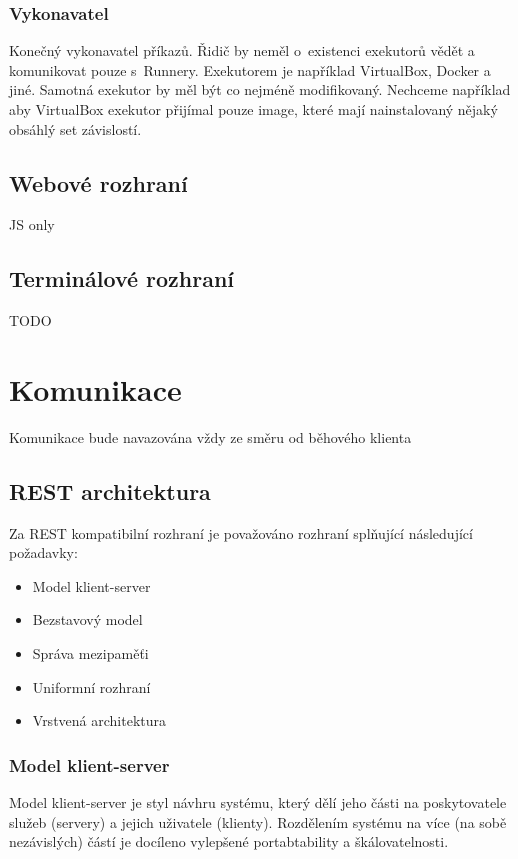 \subsubsection{Vykonavatel}

Konečný vykonavatel příkazů. Řidič by neměl o~existenci exekutorů vědět a komunikovat pouze s~Runnery.
Exekutorem je například VirtualBox, Docker a jiné.
Samotná exekutor by měl být co nejméně modifikovaný.
Nechceme například aby VirtualBox exekutor přijímal pouze image, které mají nainstalovaný nějaký obsáhlý set závislostí.

\subsection{Webové rozhraní}

JS only

\subsection{Terminálové rozhraní}

TODO

\section{Komunikace}

Komunikace bude navazována vždy ze směru od běhového klienta

\subsection{REST architektura}

Za REST kompatibilní rozhraní je považováno rozhraní splňující následující požadavky:

\begin{itemize}
	\item Model klient-server
	\item Bezstavový model
	\item Správa mezipaměťi
	\item Uniformní rozhraní
	\item Vrstvená architektura
\end{itemize}

\subsubsection{Model klient-server}

Model klient-server je styl návhru systému, který dělí jeho části na poskytovatele služeb (servery) a jejich uživatele (klienty).
Rozdělením systému na více (na sobě nezávislých) částí je docíleno vylepšené portabtability a škálovatelnosti.

